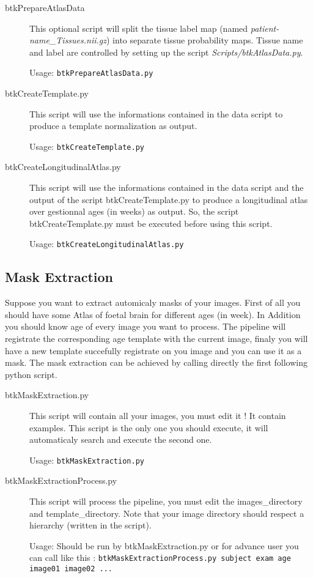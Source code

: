     \begin{description}
        \item[btkPrepareAtlasData] This optional script will split the tissue label map (named \emph{patient-name\_Tissues.nii.gz}) into separate tissue probability maps. Tissue name and label are controlled by setting up the script \emph{Scripts/btkAtlasData.py}.

        Usage: \texttt{btkPrepareAtlasData.py}

        \item[btkCreateTemplate.py] This script will use the informations contained in the data script to produce a template normalization as output.

        Usage: \texttt{btkCreateTemplate.py}

        \item[btkCreateLongitudinalAtlas.py] This script will use the informations contained in the data script and the output of the script btkCreateTemplate.py to produce a longitudinal atlas over gestionnal ages (in weeks) as output. So, the script btkCreateTemplate.py must be executed before using this script.

        Usage: \texttt{btkCreateLongitudinalAtlas.py}
    \end{description}

\subsection{Mask Extraction}
\label{subsec:Mask}

Suppose you want to extract automicaly masks of your images. First of all you should have some Atlas of foetal brain for different ages (in week).
In Addition you should know age of every image you want to process.
The pipeline will registrate the corresponding age template with the current image, finaly you will have a new template succefully registrate on you image and you can use it as a mask.
The mask extraction can be achieved by calling directly the first following python script.
    \begin{description}
        \item[btkMaskExtraction.py] This script will contain all your images, you must edit it ! It contain examples. This script is the only one you should execute, it will automaticaly search and execute the second one.

        Usage: \texttt{btkMaskExtraction.py}

        \item[btkMaskExtractionProcess.py] This script will process the pipeline, you must edit the images\_directory and template\_directory. Note that your image directory should respect a hierarchy (written in the script).

        Usage: Should be run by btkMaskExtraction.py or for advance user you can call like this : \texttt{btkMaskExtractionProcess.py subject exam age image01 image02 ...}
    \end{description}
